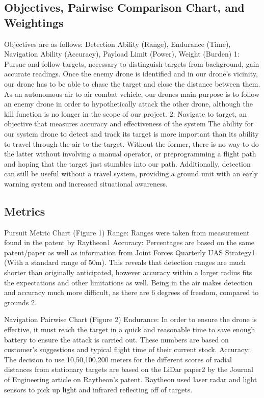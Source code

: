 \documentclass[10pt]{article}
\begin{document}
\subsection{Objectives, Pairwise Comparison Chart, and Weightings}
Objectives are as follows: 
Detection Ability (Range), Endurance (Time), Navigation Ability (Accuracy), Payload Limit (Power), Weight (Burden)
1: Pursue and follow targets, necessary to distinguish targets from background, gain accurate readings.  
Once the enemy drone is identified and in our drone's vicinity, our drone has to be able to chase the target and close the distance between them.  As an autonomous air to air combat vehicle, our drones main purpose is to follow an enemy drone in order to hypothetically attack the other drone, although the kill function is no longer in the scope of our project.  
2: Navigate to target, an objective that measures accuracy and effectiveness of the system
The ability for our system drone to detect and track its target is more important than its ability to travel through the air to the target. Without the former, there is no way to do the latter without involving a manual operator, or preprogramming a flight path and hoping that the target just stumbles into our path. Additionally, detection can still be useful without a travel system, providing a ground unit with an early warning system and increased situational awareness.

\subsection{Metrics} 
Pursuit Metric Chart (Figure 1)
Range: Ranges were taken from measurement found in the patent by Raytheon1
Accuracy: Percentages are based on the same patent/paper as well as information from Joint Forces Quarterly UAS Strategy1. (With a standard range of 50m). This reveals that detection ranges are much shorter than originally anticipated, however accuracy within a larger radius fits the expectations and other limitations as well. Being in the air makes detection and accuracy much more difficult, as there are 6 degrees of freedom, compared to grounds 2. 

Navigation Pairwise Chart (Figure 2)
Endurance: In order to ensure the drone is effective, it must reach the target in a quick and reasonable time to save enough battery to ensure the attack is carried out.  These numbers are based on customer’s suggestions and typical flight time of their current stock.
Accuracy: The decision to use 10,50,100,200 meters for the different scores of radial distances from stationary targets are based on the LiDar paper2 by the Journal of Engineering article on Raytheon’s patent. Raytheon used laser radar and light sensors to pick up light and infrared reflecting off of targets.  
\end{document}
